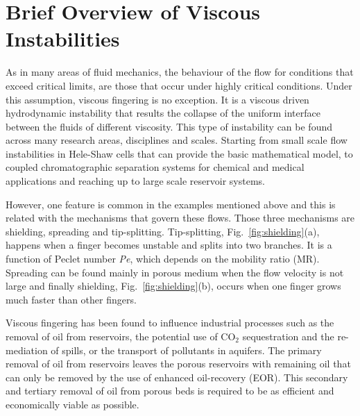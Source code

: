 \documentclass[preprint,authoryear,12pt]{elsarticle}
\begin{document}
\section{Brief Overview of Viscous Instabilities}\label{section:ViscousInstabilities}
As in many areas of fluid mechanics, the behaviour of the flow for conditions that exceed critical limits, are those that occur under highly critical conditions. Under this assumption, viscous fingering is no exception. It is a viscous driven hydrodynamic instability that results the collapse of the uniform interface between the fluids of different viscosity. This type of instability can be found across many research areas, disciplines and scales. Starting from small scale flow instabilities in Hele-Shaw cells that can provide the basic mathematical model, to coupled chromatographic separation systems for chemical and medical applications and reaching up to large scale reservoir systems.

However, one feature is common in the examples mentioned above and this is related with the mechanisms that govern these flows. Those three mechanisms are shielding, spreading and tip-splitting. Tip-splitting, Fig.~\ref{fig:shielding}(a), happens when a finger becomes unstable and splits into two branches. It is a function of Peclet number \textit{Pe}, which depends on the mobility ratio (MR). Spreading can be found mainly in porous medium when the flow velocity is not large and finally shielding, Fig.~\ref{fig:shielding}(b), occurs when one finger grows much faster than other fingers.


Viscous fingering has been found to influence industrial processes such as the removal of oil from reservoirs, the potential use of CO$_2$ sequestration and the re-mediation of spills, or the transport of pollutants in aquifers. The primary removal of oil from reservoirs leaves the porous reservoirs with remaining oil that can only be removed by the use of enhanced oil-recovery (EOR). This secondary and tertiary removal of oil from porous beds is required to be as efficient and economically viable as possible.
 

\end{document}
